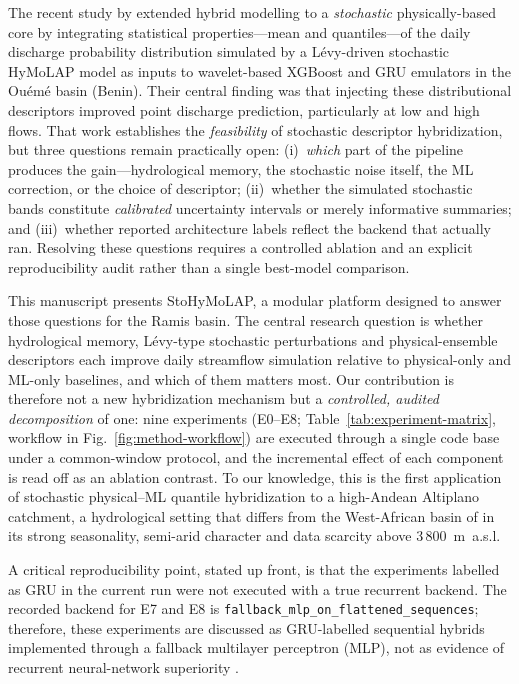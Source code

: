\documentclass[a4paper,fleqn]{cas-sc}
\begin{document}
The recent study by \citet{houenafa2025} extended hybrid modelling to a
\emph{stochastic} physically-based core by integrating statistical
properties---mean and quantiles---of the daily discharge probability
distribution simulated by a L\'{e}vy-driven stochastic HyMoLAP model as
inputs to wavelet-based XGBoost and GRU emulators in the Ou\'{e}m\'{e}
basin (Benin). Their central finding was that injecting these
distributional descriptors improved point discharge prediction,
particularly at low and high flows. That work establishes the
\emph{feasibility} of stochastic descriptor hybridization, but three
questions remain practically open: (i)~\emph{which} part of the
pipeline produces the gain---hydrological memory, the stochastic noise
itself, the ML correction, or the choice of descriptor; (ii)~whether
the simulated stochastic bands constitute \emph{calibrated} uncertainty
intervals or merely informative summaries; and (iii)~whether reported
architecture labels reflect the backend that actually ran. Resolving
these questions requires a controlled ablation and an explicit
reproducibility audit \citep{hall2021} rather than a single
best-model comparison.

This manuscript presents StoHyMoLAP, a modular platform designed to
answer those questions for the Ramis basin. The central research
question is whether hydrological memory, L\'{e}vy-type stochastic
perturbations and physical-ensemble descriptors each improve daily
streamflow simulation relative to physical-only and ML-only baselines,
and which of them matters most. Our contribution is therefore not a new
hybridization mechanism but a \emph{controlled, audited decomposition}
of one: nine experiments (E0--E8; Table~\ref{tab:experiment-matrix},
workflow in Fig.~\ref{fig:method-workflow}) are executed through a
single code base under a common-window protocol, and the incremental
effect of each component is read off as an ablation contrast. To our
knowledge, this is the first application of stochastic physical--ML
quantile hybridization to a high-Andean Altiplano catchment, a
hydrological setting that differs from the West-African basin of
\citet{houenafa2025} in its strong seasonality, semi-arid character
and data scarcity above 3\,800~m~a.s.l.

A critical reproducibility point, stated up front, is that the
experiments labelled as GRU in the current run were not executed with
a true recurrent backend. The recorded backend for E7 and E8 is
\texttt{fallback\_mlp\_on\_flattened\_sequences}; therefore, these
experiments are discussed as GRU-labelled sequential hybrids
implemented through a fallback multilayer perceptron (MLP), not as
evidence of recurrent neural-network superiority \citep{kratzert2018}.
\end{document}
